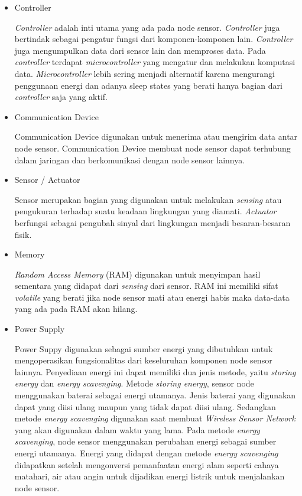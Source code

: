 \begin{itemize}
	\item Controller
	
	\textit{Controller} adalah inti utama yang ada pada node sensor. \textit{Controller} juga bertindak sebagai pengatur fungsi dari komponen-komponen lain. \textit{Controller} juga mengumpulkan data dari sensor lain dan memproses data. Pada \textit{controller} terdapat \textit{microcontroller} yang mengatur dan melakukan komputasi data. \textit{Microcontroller} lebih sering menjadi alternatif karena mengurangi penggunaan energi dan adanya sleep states yang berati hanya bagian dari \textit{controller} saja yang aktif.
	
	\item Communication Device
	
	Communication Device digunakan untuk menerima atau mengirim data antar node sensor. Communication Device membuat node sensor dapat terhubung dalam jaringan dan berkomunikasi dengan node sensor lainnya. 
	
	\item Sensor / Actuator
	
	Sensor merupakan bagian yang digunakan untuk melakukan \textit{sensing} atau pengukuran terhadap suatu keadaan lingkungan yang diamati. \textit{Actuator} berfungsi sebagai pengubah sinyal dari lingkungan menjadi besaran-besaran fisik.
	
	\item Memory
	
	\textit{Random Access Memory} (RAM) digunakan untuk menyimpan hasil sementara yang didapat dari \textit{sensing} dari sensor. RAM ini memiliki sifat \textit{volatile} yang berati jika node sensor mati atau energi habis maka data-data yang ada pada RAM akan hilang. 
	
	\item Power Supply
	
	Power Suppy digunakan sebagai sumber energi yang dibutuhkan untuk mengoperasikan fungsionalitas dari keseluruhan komponen node sensor lainnya. Penyediaan energi ini dapat memiliki dua jenis metode, yaitu \textit{storing energy} dan \textit{energy scavenging}. Metode \textit{storing energy}, sensor node menggunakan baterai sebagai energi utamanya. Jenis baterai yang digunakan dapat yang diisi ulang maupun yang tidak dapat diisi ulang. Sedangkan metode \textit{energy scavenging} digunakan saat membuat \textit{Wireless Sensor Network} yang akan digunakan dalam waktu yang lama. Pada metode \textit{energy scavenging}, node sensor menggunakan perubahan energi sebagai sumber energi utamanya. Energi yang didapat dengan metode \textit{energy scavenging} didapatkan setelah mengonversi pemanfaatan energi alam seperti cahaya matahari, air atau angin untuk dijadikan energi listrik untuk menjalankan node sensor.
	
\end{itemize}

